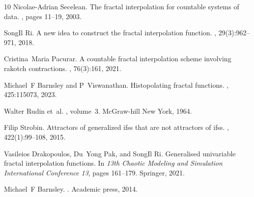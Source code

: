\documentclass[sn-mathphys-num]{sn-jnl}
\numberwithin{equation}{section}
\begin{document}
\begin{thebibliography}{10}
Nicolae-Adrian Secelean.
\newblock The fractal interpolation for countable systems of data.
, pages 11--19, 2003.

SongIl Ri.
\newblock A new idea to construct the fractal interpolation function.
, 29(3):962--971, 2018.

Cristina~Maria Pacurar.
\newblock A countable fractal interpolation scheme involving rakotch contractions.
, 76(3):161, 2021.

Michael~F Barnsley and P~Viswanathan.
\newblock Histopolating fractal functions.
, 425:115073, 2023.

Walter Rudin et~al.
, volume~3.
\newblock McGraw-hill New York, 1964.

Filip Strobin.
\newblock Attractors of generalized ifss that are not attractors of ifss.
, 422(1):99--108, 2015.

Vasileios Drakopoulos, Du~Yong Pak, and SongIl Ri.
\newblock Generalised univariable fractal interpolation functions.
\newblock In {\em 13th Chaotic Modeling and Simulation International Conference 13}, pages 161--179. Springer, 2021.

Michael~F Barnsley.
.
\newblock Academic press, 2014.

\end{thebibliography}
\end{document}
